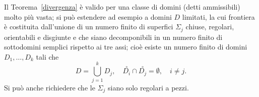 \documentclass[a4paper]{book}
\numberwithin{equation}{section}
\theoremstyle{plain}
\theoremstyle{definition}
\theoremstyle{remark}
\theoremstyle{example}
\begin{document}
	Il Teorema~\ref{divergenza} è valido per una classe di domini (detti ammissibili) molto più vasta; si può estendere ad esempio a domini $D$ limitati, la cui frontiera è costituita dall'unione di un numero finito di superfici $\Sigma_j$ chiuse, regolari, orientabili e disgiunte e che siano decomponibili in un numero finito di sottodomini semplici rispetto ai tre assi; cioè esiste un numero finito di domini $D_1, \dots, D_k$ tali che
	\begin{equation*}
		D=\bigcup_{j=1}^k D_j, \quad \overset{\circ}{D_i}\cap\overset{\circ}{D_j} = \emptyset, \quad i \ne j.
	\end{equation*}
	Si può anche richiedere che le $\Sigma_j$ siano solo regolari a pezzi.






	
\end{document}
